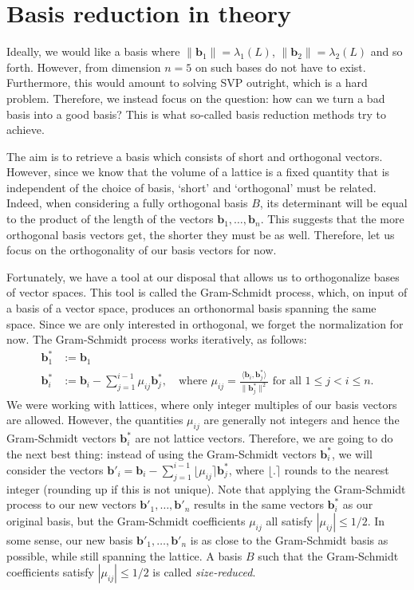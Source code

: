 \documentclass{article}[11pt]
\newcommand{\bfb}{\mathbf{b}}
\newcommand*{\sumi}[3]{{\sum_{#1 = #2}^{#3}}}
\begin{document}
\section*{Basis reduction in theory}
Ideally, we would like a basis where $\|\bfb_1\| = \lambda_1(L)$, $\|\bfb_2\| = \lambda_2(L)$ and so forth. However, from dimension $n=5$ on such bases do not have to exist. Furthermore, this would amount to solving SVP outright, which is a hard problem. Therefore, we instead focus on the question: how can we turn a bad basis into a good basis? This is what so-called basis reduction methods try to achieve.

The aim is to retrieve a basis which consists of short and orthogonal vectors. However, since we know that the volume of a lattice is a fixed quantity that is independent of the choice of basis, `short' and `orthogonal' must be related. Indeed, when considering a fully orthogonal basis $B$, its determinant will be equal to the product of the length of the vectors $\bfb_1,\ldots,\bfb_n$. This suggests that the more orthogonal basis vectors get, the shorter they must be as well. Therefore, let us focus on the orthogonality of our basis vectors for now. 

Fortunately, we have a tool at our disposal that allows us to orthogonalize bases of vector spaces. This tool is called the Gram-Schmidt process, which, on input of a basis of a vector space, produces an orthonormal basis spanning the same space. Since we are only interested in orthogonal, we forget the normalization for now. The Gram-Schmidt process works iteratively, as follows:
    \begin{align*}
    \bfb_1^* &:= \bfb_1\\
    \bfb_i^* &:= \bfb_i - \sumi{j}{1}{i-1} \mu_{ij}\bfb^*_j, \quad \text{where  } \mu_{ij} = \frac{\langle\bfb_i,\bfb_j^*\rangle}{\|\bfb_j^*\|^2}\text{ for all } 1\leq j < i \leq n.
    \end{align*}
We were working with lattices, where only integer multiples of our basis vectors are allowed. However, the quantities $\mu_{ij}$ are generally not integers and hence the Gram-Schmidt vectors $\bfb_i^*$ are not lattice vectors. Therefore, we are going to do the next best thing: instead of using the Gram-Schmidt vectors $\bfb_i^*$, we will consider the vectors $\bfb'_i = \bfb_i - \sumi{j}{1}{i-1} \lfloor \mu_{ij} \rceil \bfb^*_j$, where $\lfloor.\rceil$ rounds to the nearest integer (rounding up if this is not unique). Note that applying the Gram-Schmidt process to our new vectors $\bfb'_1,\ldots,\bfb'_n$ results in the same vectors $\bfb_i^*$ as our original basis, but the Gram-Schmidt coefficients $\mu_{ij}$ all satisfy $|\mu_{ij}| \leq 1/2$. In some sense, our new basis $\bfb'_1,\ldots,\bfb'_n$ is as close to the Gram-Schmidt basis as possible, while still spanning the lattice. A basis $B$ such that the Gram-Schmidt coefficients satisfy $|\mu_{ij}| \leq 1/2$ is called {\it size-reduced}.
\end{document}
